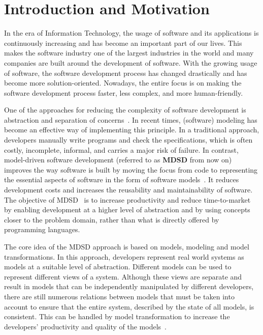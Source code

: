 \section{Introduction and Motivation}\label{sec:introduction}
In the era of Information Technology, the usage of software and its applications is continuously increasing and has become an important part of our lives. This makes the software industry one of the largest industries in the world and many companies are built around the development of software. With the growing usage of software, the software development process has changed drastically and has become more solution-oriented. Nowadays, the entire focus is on making the software development process faster, less complex, and more human-friendly. 

One of the approaches for reducing the complexity of software development is abstraction and separation of concerns~\cite{modeltransform}. In recent times, (software) modeling has become an effective way of implementing this principle. In a traditional approach, developers manually write programs and check the specifications, which is often costly, incomplete, informal, and carries a major risk of failure. In contrast, model-driven software development (referred to as \textbf{MDSD} from now on) improves the way software is built by moving the focus from code to representing the essential aspects of software in the form of software models~\cite{modeltransform}. It reduces development costs and increases the reusability and maintainability of software. The objective of MDSD~\cite{modeltransform} is to increase productivity and reduce time-to-market by enabling development at a higher level of abstraction and by using concepts closer to the problem domain, rather than what is directly offered by programming languages.
 
The core idea of the MDSD approach is based on models, modeling and model transformations. In this approach, developers represent real world systems as models at a suitable level of abstraction. Different models can be used to represent different views of a system.  Although these views are separate and result in models that can be independently manipulated by different developers, there are still numerous relations between models that must be taken into account to ensure that the entire system, described by the state of all models, is consistent. This can be handled by model transformation to increase the developers' productivity and quality of the models~\cite{mdsd}.


